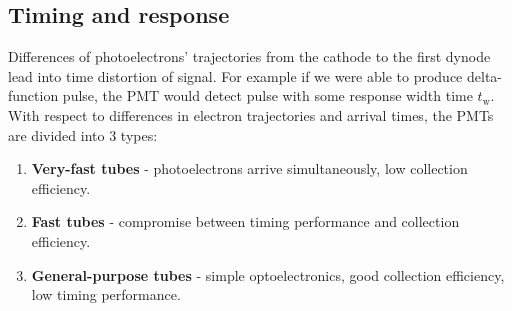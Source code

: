 
\subsection{Timing and response}
Differences of photoelectrons' trajectories from the cathode to the first dynode lead into time distortion of signal. For example if we were able to produce delta-function pulse, the PMT would detect pulse with some response width time $t_\textrm{w}$.
With respect to differences in electron trajectories and arrival times, the PMTs are divided into 3 types:
\begin{enumerate}
\item \textbf{Very-fast tubes} - photoelectrons arrive simultaneously, low collection efficiency.
\item \textbf{Fast tubes} - compromise between timing performance and collection efficiency.
\item \textbf{General-purpose tubes} - simple optoelectronics, good collection efficiency, low timing performance.
\end{enumerate}

